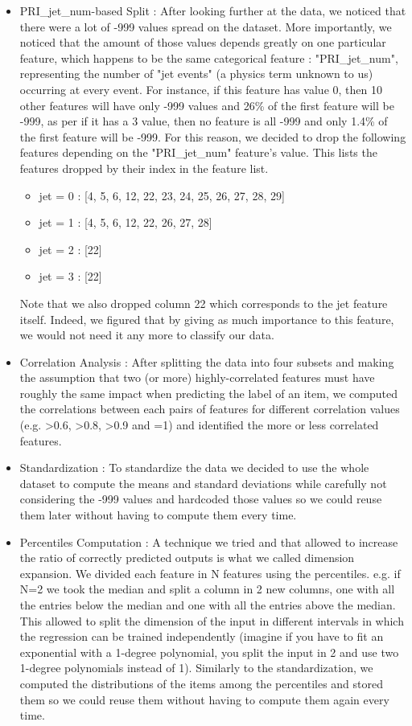\documentclass[10pt,conference,compsocconf]{IEEEtran}
\begin{document}
\begin{itemize}
\item PRI\_jet\_num-based Split :
After looking further at the data, we noticed that there were a lot of -999 values spread on the dataset. More importantly, we noticed that the amount of those values depends greatly on one particular feature, which happens to be the same categorical feature : "PRI\_jet\_num", representing the number of "jet events" (a physics term unknown to us) occurring at every event. For instance, if this feature has value 0, then 10 other features will have only -999 values and 26\% of the first feature will be -999, as per if it has a 3 value, then no feature is all -999 and only 1.4\% of the first feature will be -999.
For this reason, we decided to drop the following features depending on the "PRI\_jet\_num" feature's value. This lists the features dropped by their index in the feature list.
\begin{itemize}
\item jet = 0 : [4, 5, 6, 12, 22, 23, 24, 25, 26, 27, 28, 29]
\item jet = 1 : [4, 5, 6, 12, 22, 26, 27, 28]
\item jet = 2 : [22]
\item jet = 3 : [22]
\end{itemize}
Note that we also dropped column 22 which corresponds to the jet feature itself. Indeed, we figured that by giving as much importance to this feature, we would not need it any more to classify our data.

\item Correlation Analysis :
After splitting the data into four subsets and making the assumption that two (or more) highly-correlated features must have roughly the same impact when predicting the label of an item, we computed the correlations between each pairs of features for different correlation values (e.g. >0.6, >0.8, >0.9 and =1) and identified the more or less correlated features.


\item Standardization :
To standardize the data we decided to use the whole dataset to compute the means and standard deviations while carefully not considering the -999 values and hardcoded those values so we could reuse them later without having to compute them every time. 

\item Percentiles Computation :
A technique we tried and that allowed to increase the ratio of correctly predicted outputs is what we called dimension expansion. We divided each feature in N features using the percentiles. e.g. if N=2 we took the median and split a column in 2 new columns, one with all the entries below the median and one with all the entries above the median. This allowed to split the dimension of the input in different intervals in which the regression can be trained independently (imagine if you have to fit an exponential with a 1-degree polynomial, you split the input in 2 and use two 1-degree polynomials instead of 1). Similarly to the standardization, we computed the distributions of the items among the percentiles and stored them so we could reuse them without having to compute them again every time.

\end{itemize}
\end{document}
